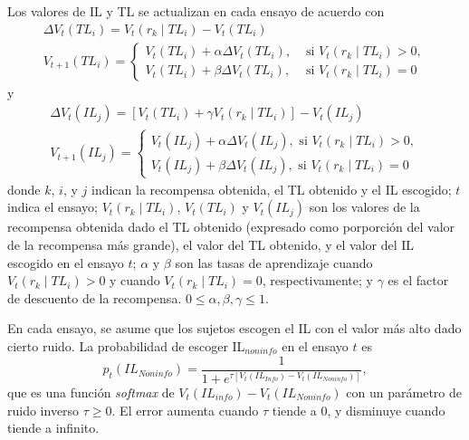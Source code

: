 \documentclass[a4paper,12pt]{article}
\begin{document}
Los valores de IL y TL se actualizan en cada ensayo de acuerdo con$$
\begin{array}{l}
	\Delta V_{t}\left(T L_{i}\right)=V_{t}\left(r_{k} \mid T L_{i}\right)-V_{t}\left(T L_{i}\right) \\
	V_{t+1}\left(T L_{i}\right)=\left\{\begin{array}{ll}
			V_{t}\left(T L_{i}\right)+\alpha \Delta V_{t}\left(T L_{i}\right), & \mbox { si } V_{t}\left(r_{k} \mid T L_{i}\right)>0, \\
			V_{t}\left(T L_{i}\right)+\beta \Delta V_{t}\left(T L_{i}\right), & \mbox { si } V_{t}\left(r_{k} \mid T L_{i}\right)=0
		\end{array}\right.
	\end{array}
$$
y
$$
\begin{array}{l}
	\Delta V_{t}\left(I L_{j}\right)=\left[V_{t}\left(T L_{i}\right)+\gamma V_{t}\left(r_{k} \mid T L_{i}\right)\right]-V_{t}\left(I L_{j}\right) \\
	V_{t+1}\left(I L_{j}\right)=\left\{\begin{array}{l}
		V_{t}\left(I L_{j}\right)+\alpha \Delta V_{t}\left(I L_{j}\right), \mbox { si } V_{t}\left(r_{k} \mid T L_{i}\right)>0, \\
	V_{t}\left(I L_{j}\right)+\beta \Delta V_{t}\left(I L_{j}\right), \mbox { si } V_{t}\left(r_{k} \mid T L_{i}\right)=0
\end{array}\right.
\end{array}
$$
donde $k$, $i$, y $j$ indican la recompensa obtenida, el TL obtenido y el IL escogido; $t$ indica el ensayo; $V_t(r_k\mid TL_i)$, $V_t(TL_i)$ y $V_t(IL_j)$ son los valores de la recompensa obtenida dado el TL obtenido (expresado como porporción del valor de la recompensa más grande), el valor del TL obtenido, y el valor del IL escogido en el ensayo $t$; $\alpha$ y $\beta$ son las tasas de aprendizaje cuando $V_t(r_k\mid TL_i)>0$ y cuando $V_t(r_k\mid TL_i)=0$, respectivamente; y $\gamma$ es el factor de descuento de la recompensa. $0 \leq \alpha, \beta, \gamma \leq 1$.

En cada ensayo, se asume que los sujetos escogen el IL con el valor más alto dado cierto ruido. La probabilidad de escoger IL$_{noninfo}$ en el ensayo $t$ es
$$
p_{t}(IL_{Noninfo})=\frac{1}{1+e^{\tau\left[V_{t}\left(I L_{Info}\right)-V_{t}\left(I L_{Noninfo}\right)\right]}},
$$
que es una función {\slshape softmax} de $V_t(IL_{info})-V_t(IL_{Noninfo})$ con un parámetro de ruido inverso $\tau\geq 0$. El error aumenta cuando $\tau$ tiende a 0, y disminuye cuando tiende a infinito.
\end{document}
